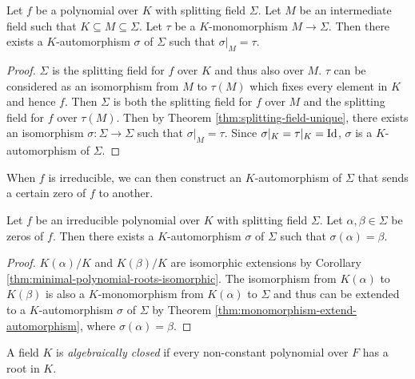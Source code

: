 \begin{theorem} \label{thm:monomorphism-extend-automorphism}
	Let $f$ be a polynomial over $K$ with splitting field $\Sigma$. Let $M$ be an intermediate field such that $K \subseteq M \subseteq \Sigma$. Let $\tau$ be a $K$-monomorphism $M \to \Sigma$. Then there exists a $K$-automorphism $\sigma$ of $\Sigma$ such that $\sigma | _M = \tau$.  
\end{theorem}

\begin{proof}
	$\Sigma$ is the splitting field for $f$ over $K$ and thus also over $M$. $\tau$ can be considered as an isomorphism from $M$ to $\tau(M)$ which fixes every element in $K$ and hence $f$. Then $\Sigma$ is both the splitting field for $f$ over $M$ and the splitting field for $f$ over $\tau(M)$. Then by Theorem \ref{thm:splitting-field-unique}, there exists an isomorphism $\sigma: \Sigma \to \Sigma$ such that $\sigma | _M = \tau$. Since $\sigma | _K = \tau |_K = \operatorname{Id}$, $\sigma$ is a $K$-automorphism of $\Sigma$. 
\end{proof}

When $f$ is irreducible, we can then construct an $K$-automorphism of $\Sigma$ that sends a certain zero of $f$ to another.

\begin{theorem} \label{thm:automorphism-from-zeros}
	Let $f$ be an irreducible polynomial over $K$ with splitting field $\Sigma$. Let $\alpha, \beta \in \Sigma$ be zeros of $f$. Then there exists a $K$-automorphism $\sigma$ of $\Sigma$ such that $\sigma(\alpha) = \beta$. 
\end{theorem}

\begin{proof}
	$K(\alpha)/K$ and $K(\beta)/K$ are isomorphic extensions by Corollary \ref{thm:minimal-polynomial-roots-isomorphic}. The isomorphism from $K(\alpha)$ to $K(\beta)$ is also a $K$-monomorphism from $K(\alpha)$ to $\Sigma$ and thus can be extended to a $K$-automorphism $\sigma$ of $\Sigma$ by Theorem \ref{thm:monomorphism-extend-automorphism}, where $\sigma(\alpha) = \beta$.
\end{proof}


\begin{definition}
	A field $K$ is \textit{algebraically closed} if every non-constant polynomial over $F$ has a root in $K$. 
\end{definition}

